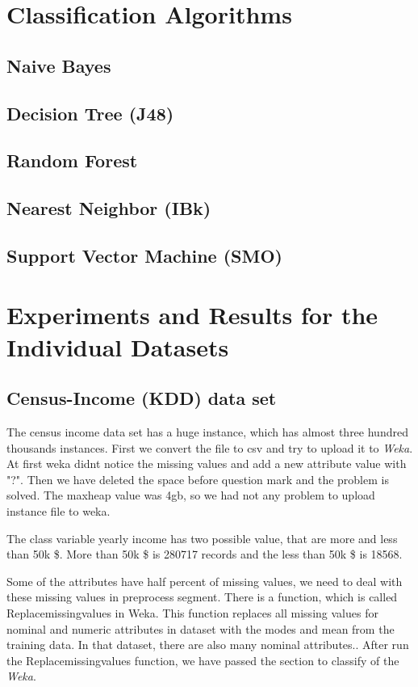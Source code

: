 \documentclass[a4paper]{article}
\begin{document}
\section{Classification Algorithms}

    \subsection{ Naive Bayes}
    \subsection{ Decision Tree (J48)}
    \subsection{ Random Forest}
    \subsection{ Nearest Neighbor (IBk)}
    \subsection{ Support Vector Machine (SMO)}

\section{Experiments and Results for the Individual Datasets}

\subsection{Census-Income (KDD) data set}

The census income data set has a huge instance, which has almost three hundred thousands  instances. First we convert the file to csv and try to upload it to \emph{Weka}. At first weka didnt notice the missing values and add a new attribute value with "?". Then we have deleted the space before question mark and the problem is solved. The maxheap value was 4gb, so we had not any problem to upload instance file to weka. 

The class variable yearly income has two possible value, that are more and less than 50k \$. More than 50k \$ is 280717 records and the less than 50k \$ is 18568. 

Some of the attributes have half percent of missing values, we need to deal with these missing values in preprocess segment. There is a function, which is called Replacemissingvalues in Weka. This function replaces all missing values for nominal and numeric attributes in dataset with the modes and mean from the training data. In that dataset, there are also many nominal attributes.. After run the Replacemissingvalues function, we have passed the section to classify of the \emph{Weka}. 
\end{document}
